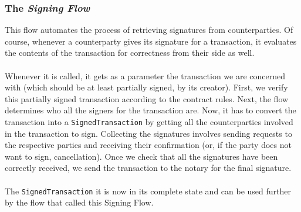 \documentclass[12pt,twoside]{article}
\begin{document}
\subsubsection{The \textit{Signing Flow}}
\label{sub:signtr}
This flow automates the process of retrieving signatures from counterparties. Of course, whenever a counterparty gives its signature for a transaction, it evaluates the contents of the transaction for correctness from their side as well.
\\ \\
Whenever it is called, it gets as a parameter the transaction we are concerned with (which should be at least partially signed, by its creator). First, we verify this partially signed transaction according to the contract rules. Next, the flow determines who all the signers for the transaction are. Now, it has to convert the transaction into a \verb|SignedTransaction| by getting all the counterparties involved in the transaction to sign. Collecting the signatures involves sending requests to the respective parties and receiving their confirmation (or, if the party does not want to sign, cancellation). Once we check that all the signatures have been correctly received, we send the transaction to the notary for the final signature.
\\ \\
The \verb|SignedTransaction| it is now in its complete state and can be used further by the flow that called this Signing Flow.
\end{document}
